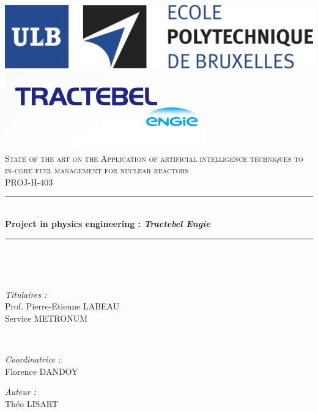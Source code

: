\begin{titlepage}
	\centering
    \vspace*{0.3 cm}
    \includegraphics[scale = 0.5]{Figures/polytech.png}\\[1.0 cm]	%
    \includegraphics[scale = 0.5]{Figures/tractebelengie.png}\\[1.0 cm]	%

    \textsc{\LARGE State of the art on the Application of artificial intelligence techniques to in-core fuel management for nuclear reactors}\\[1 cm]	%
	\textsc{\Large PROJ-H-403}\\[0.5 cm]				%
	\rule{\linewidth}{0.2 mm} \\[0.4 cm]
	{ \huge \bfseries Project in physics engineering : \textit{Tractebel Engie}}\\
	\rule{\linewidth}{0.2 mm} \\[1 cm]
    
    \begin{minipage}{1.0\textwidth}
    \tableofcontents
    \end{minipage} \\[1.5cm]
	
	\begin{minipage}{0.4\textwidth}
		\begin{flushleft} \large
			\emph{Titulaires :}\\
			Prof. Pierre-Etienne LABEAU\\
            Service METRONUM\\
            
		\end{flushleft}
			\end{minipage}~
			\begin{minipage}{0.4\textwidth}
            
		\begin{flushright} \large
			\emph{Coordinatrice :} \\
			Florence DANDOY\\
		\end{flushright}
		
		\begin{flushright} \large
			\emph{Auteur :} \\
			Théo LISART\\
		\end{flushright}
	\end{minipage}\\[0.5 cm]

\end{titlepage}


